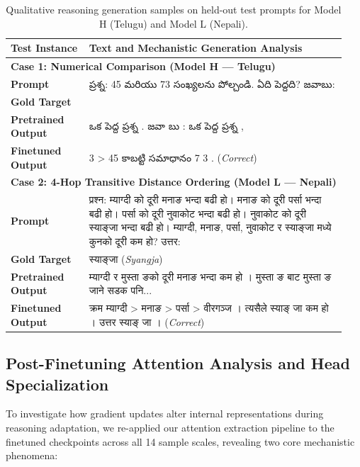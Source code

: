 \documentclass[8pt]{article}
\newcommand{\telugu}[1]{{\telugufont #1}}
\newcommand{\nepali}[1]{{\nepalifont #1}}
\begin{document}
\begin{table}[H]
    \centering
    \small
    \setlength{\tabcolsep}{5pt}
    \begin{tabular}{p{0.22\linewidth}p{0.72\linewidth}}
        \toprule
        \textbf{Test Instance} & \textbf{Text and Mechanistic Generation Analysis} \\
        \midrule
        \multicolumn{2}{l}{\textbf{Case 1: Numerical Comparison (Model H — Telugu)}} \\
        \textbf{Prompt} & \telugu{ప్రశ్న: 45 మరియు 73 సంఖ్యలను పోల్చండి. ఏది పెద్దది? జవాబు:} \\
        \textbf{Gold Target} & \telugu{73} \\
        \textbf{Pretrained Output} & \telugu{ఒక పెద్ద ప్రశ్న . జవా బు : ఒక పెద్ద ప్రశ్న ,} \\
        \textbf{Finetuned Output} & \telugu{7 3 > 45 కాబట్టి సమాధానం 7 3 .} (\textit{Correct}) \\
        \midrule
        \multicolumn{2}{l}{\textbf{Case 2: 4-Hop Transitive Distance Ordering (Model L — Nepali)}} \\
        \textbf{Prompt} & \nepali{प्रश्न: म्याग्दी को दूरी मनाङ भन्दा बढी हो। मनाङ को दूरी पर्सा भन्दा बढी हो। पर्सा को दूरी नुवाकोट भन्दा बढी हो। नुवाकोट को दूरी स्याङ्जा भन्दा बढी हो। म्याग्दी, मनाङ, पर्सा, नुवाकोट र स्याङ्जा मध्ये कुनको दूरी कम हो? उत्तर:} \\
        \textbf{Gold Target} & \nepali{स्याङ्जा} (\textit{Syangja}) \\
        \textbf{Pretrained Output} & \nepali{म्याग्दी र मुस्ता ङको दूरी मनाङ भन्दा कम हो । मुस्ता ङ बाट मुस्ता ङ जाने सडक पनि...} \\
        \textbf{Finetuned Output} & \nepali{क्रम म्याग्दी > मनाङ > पर्सा > वीरगञ्ज । त्यसैले स्याङ् जा कम हो । उत्तर स्याङ् जा ।} (\textit{Correct}) \\
        \midrule
        \bottomrule
    \end{tabular}
    \caption{Qualitative reasoning generation samples on held-out test prompts for Model H (Telugu) and Model L (Nepali).}
    \label{tab:reasoning_qualitative_samples}
\end{table}


\subsection{Post-Finetuning Attention Analysis and Head Specialization}
\label{subsec:finetuned_attention}

To investigate how gradient updates alter internal representations during reasoning adaptation, we re-applied our attention extraction pipeline to the finetuned checkpoints across all 14 sample scales, revealing two core mechanistic phenomena:
\end{document}
